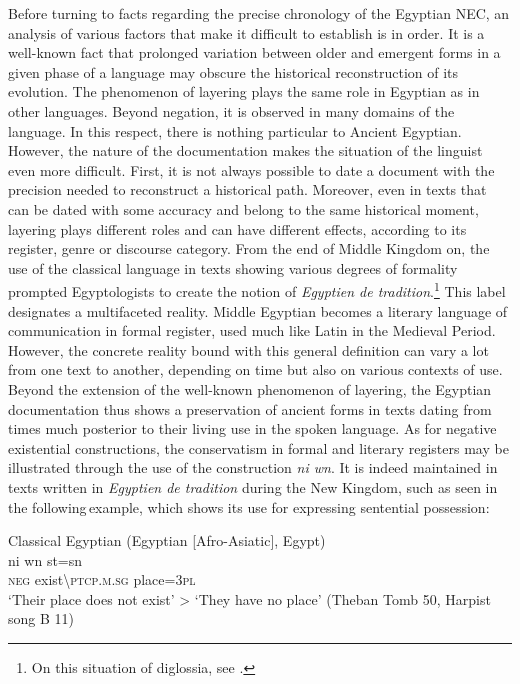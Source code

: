 \documentclass[output=paper]{langsci/langscibook}
\begin{document}
Before turning to facts regarding the precise chronology of the Egyptian NEC, an analysis of various factors that make it difficult to establish is in order. It is a well-known fact that prolonged variation between older and emergent forms in a given phase of a language may obscure the historical reconstruction of its evolution. The phenomenon of layering plays the same role in Egyptian as in other languages. Beyond negation, it is observed in many domains of the language. In this respect, there is nothing particular to Ancient Egyptian. However, the nature of the documentation makes the situation of the linguist even more difficult. First, it is not always possible to date a document with the precision needed to reconstruct a historical path. Moreover, even in texts that can be dated with some accuracy and belong to the same historical moment, layering plays different roles and can have different effects, according to its register, genre or discourse category. From the end of Middle Kingdom on, the use of the classical language in texts showing various degrees of formality prompted Egyptologists to create the notion of \emph{Egyptien de tradition}.\footnote{On this situation of diglossia, see \citet{Vernus1996}.} 
This label designates a multifaceted reality. Middle Egyptian becomes a literary language of communication in formal register, used much like Latin in the Medieval Period. However, the concrete reality bound with this general definition can vary a lot from one text to another, depending on time but also on various contexts of use. Beyond the extension of the well-known phenomenon of layering, the Egyptian documentation thus shows a preservation of ancient forms in texts dating from times much posterior to their living use in the spoken language. As for negative existential constructions, the conservatism in formal and literary registers may be illustrated through the use of the construction \textit{ni wn}. It is indeed maintained in texts written in \emph{Egyptien de tradition} during the New Kingdom, such as seen in the following example, which shows its use for expressing sentential possession:  

\ea Classical Egyptian (Egyptian [Afro-Asiatic], Egypt) \label{ex:AE46}\\
    \gll ni wn st=sn \\
    \textsc{neg} exist\textbackslash\textsc{ptcp.m.sg} place=\textsc{3pl}\\
    \glt ‘Their place does not exist’ > ‘They have no place’ (Theban Tomb 50, Harpist song B 11) 
\z 
 
\end{document}
